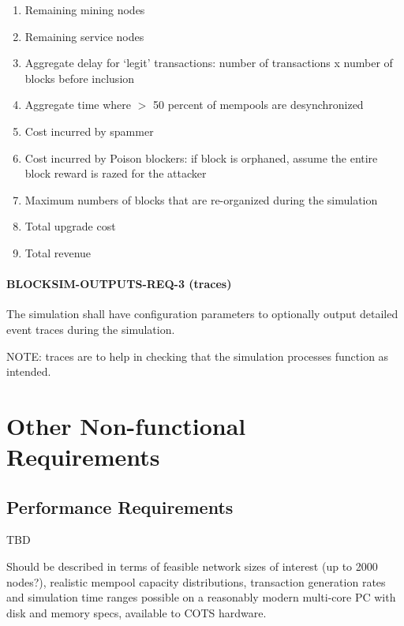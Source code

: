 \documentclass{scrreprt}
\begin{document}
        \begin{enumerate}
          \item Remaining mining nodes
          \item Remaining service nodes
          \item Aggregate delay for `legit' transactions: number of
            transactions x
            number of blocks before inclusion
          \item Aggregate time where $>$ 50 percent of mempools are
            desynchronized
          \item Cost incurred by spammer
          \item Cost incurred by Poison blockers: if block is orphaned, assume
            the entire block reward is razed for the attacker
          \item Maximum numbers of blocks that are re-organized during the
            simulation
          \item Total upgrade cost
          \item Total revenue
        \end{enumerate}

      \subsubsection{BLOCKSIM-OUTPUTS-REQ-3 (traces)}

        The simulation shall have configuration parameters to optionally
        output detailed event traces during the simulation.

        NOTE: traces are to help in checking that the simulation processes
        function as intended.

\chapter{Other Non-functional Requirements}

  \section{Performance Requirements}

    TBD

    Should be described in terms of feasible network sizes of interest (up to
    2000 nodes?), realistic mempool capacity distributions,
    transaction generation rates and simulation time ranges possible on a
    reasonably modern multi-core PC with disk and memory specs,
    available to COTS hardware.
\end{document}

